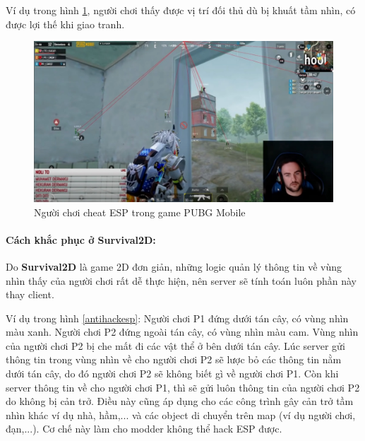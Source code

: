 \documentclass[12pt,a4paper]{article}
\begin{document}
  Ví dụ trong hình \ref{cheat_esp_pubgm}, người chơi thấy được vị trí đối thủ dù bị khuất tầm nhìn, có được lợi thế khi giao tranh.
  \begin{figure}[H]
    \centering
    \includegraphics[width=\textwidth]{Img/cheat/cheat_esp_pubgm.jpg}
    \caption{Người chơi cheat ESP trong game PUBG Mobile\protect\footnotemark}
    \label{cheat_esp_pubgm}
  \end{figure}
  
  \paragraph{Cách khắc phục ở Survival2D:}\mbox{}
  
  Do \textbf{Survival2D} là game 2D đơn giản, những logic quản lý thông tin về vùng nhìn thấy của người chơi rất dễ thực hiện, nên server sẽ tính toán luôn phần này thay client.
  
  Ví dụ trong hình \ref{antihackesp}: Người chơi P1 đứng dưới tán cây, có vùng nhìn màu xanh. Người chơi P2 đứng ngoài tán cây, có vùng nhìn màu cam. Vùng nhìn của người chơi P2 bị che mất đi các vật thể ở bên dưới tán cây. Lúc server gửi thông tin trong vùng nhìn về cho người chơi P2 sẽ lược bỏ các thông tin nằm dưới tán cây, do đó người chơi P2 sẽ không biết gì về người chơi P1. Còn khi server thông tin về cho người chơi P1, thì sẽ gửi luôn thông tin của người chơi P2 do không bị cản trở. Điều này cũng áp dụng cho các công trình gây cản trở tầm nhìn khác ví dụ nhà, hầm,... và các object di chuyển trên map (ví dụ người chơi, đạn,...). Cơ chế này làm cho modder không thể hack ESP được.
  
\end{document}

